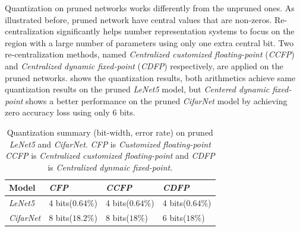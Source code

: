 \documentclass[a4paper,12pt]{report}
\begin{document}
Quantization on pruned networks works differently from the unpruned ones.
As illustrated before, pruned network have central values that are non-zeros.
Re-centralization significantly helps number representation systems to focus
on the region with a large number of parameters using only one extra central bit.
Two re-centralization methods, named \textit{Centralized customized floating-point}
(\textit{CCFP}) and \textit{Centralized dynamic fixed-point} (\textit{CDFP}) respectively, are
applied on the pruned networks.
 shows the quantization results, both arithmetics
achieve same quantization results on the pruned \textit{LeNet5} model, but
\textit{Centered dynamic fixed-point} shows a better performance on
the pruned \textit{CifarNet} model by achieving zero accuracy loss using only
$6$ bits.

\begin{table}[!h]
  \centering
  \begin{tabular}{llll}
    \hline
    Model             &\textit{CFP}     &\textit{CCFP}    &\textit{CDFP}\\
    \hline
    \hline
    \textit{LeNet5}   &4 bits($0.64\%$)  &4 bits($0.64\%$)  &4 bits($0.64\%$)\\
    \textit{CifarNet} &8 bits($18.2\%$) &8 bits($18\%$)   &6 bits($18\%$)\\
    \hline
    \hline
  \end{tabular}
  \caption{Quantization summary (bit-width, error rate) on pruned \textit{LeNet5}
  and \textit{CifarNet}. \textit{CFP} is \textit{Customized floating-point}
  \textit{CCFP} is \textit{Centralized customized floating-point} and
  \textit{CDFP} is \textit{Centralized dynmaic fixed-point}.
  }
  \label{tab:quantize_summary2}
\end{table}


%
\end{document}
